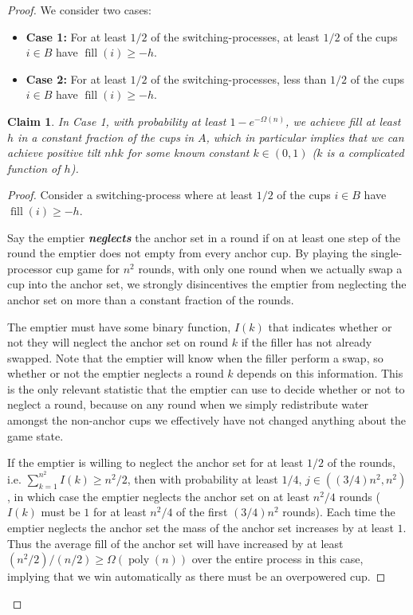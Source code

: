\documentclass[twocolumn]{article}[11pt]
\newcommand{\defn}[1]{{\textit{\textbf{\boldmath #1}}}}
\DeclareMathOperator{\poly}{\text{poly}}
\DeclareMathOperator{\fil}{\text{fill}}
\newtheorem{clm}{Claim}
\begin{document}
\begin{proof}
We consider two cases:
\begin{itemize}
  \item \textbf{Case 1:} For at least $1/2$ of the switching-processes, at
    least $1/2$ of the cups $i \in B$ have $\fil(i) \ge -h$.
  \item \textbf{Case 2:} For at least $1/2$ of the switching-processes, less
    than $1/2$ of the cups $i \in B$ have $\fil(i) \ge -h$.
\end{itemize}

\begin{clm}
  \label{clm:reg} In Case 1, with probability at least $1-e^{-\Omega(n)}$, we
  achieve fill at least $h$ in a constant fraction of the cups in $A$, which in
  particular implies that we can achieve positive tilt $nhk$ for some known
  constant $k \in (0,1)$ ($k$ is a complicated function of $h$).
\end{clm}
\begin{proof}
  Consider a switching-process where at least $1/2$ of the cups $i \in B$
  have $\fil(i) \ge -h$.

  Say the emptier \defn{neglects} the anchor set in a round if on at least one
  step of the round the emptier does not empty from every anchor cup. By
  playing the single-processor cup game for $n^2$ rounds, with only one round
  when we actually swap a cup into the anchor set, we strongly disincentives
  the emptier from neglecting the anchor set on more than a constant fraction
  of the rounds. 

  The emptier must have some binary function, $I(k)$ that indicates whether or
  not they will neglect the anchor set on round $k$ if the filler has not already
  swapped. Note that the emptier will know when the filler perform a swap, so
  whether or not the emptier neglects a round $k$ depends on this information.
  This is the only relevant statistic that the emptier can use to decide
  whether or not to neglect a round, because on any round when we simply
  redistribute water amongst the non-anchor cups we effectively have not
  changed anything about the game state. 

  If the emptier is willing to neglect the anchor set for at least $1/2$ of the
  rounds, i.e. $\sum_{k=1}^{n^2} I(k) \ge n^2 / 2$, then with probability at
  least $1/4$, $j \in ((3/4) n^2, n^2)$, in which case the emptier neglects the anchor set
  on at least $n^2/4$ rounds ($I(k)$ must be $1$ for at least $n^2/4$ of the
  first $(3/4)n^2$ rounds). Each time the emptier neglects the anchor set the
  mass of the anchor set increases by at least $1$. Thus the average fill of the anchor
  set will have increased by at least $(n^2/2)/(n/2) \ge \Omega(\poly(n))$ over the
  entire process in this case, implying that we  win automatically as there
  must be an overpowered cup. 


\end{proof}
\end{proof}
\end{document}
